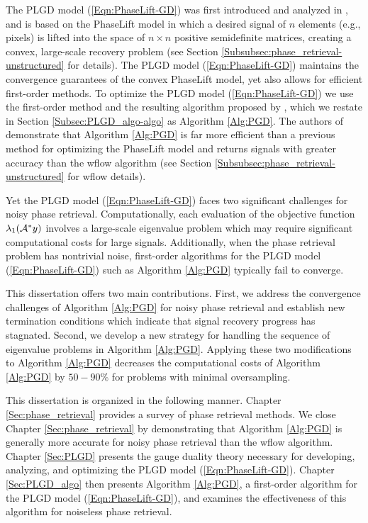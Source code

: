 The PLGD model (\ref{Eqn:PhaseLift-GD}) was first introduced and analyzed in \cite{DBLP:journals/siamsc/FriedlanderM16}, and is based on the PhaseLift model \cite{DBLP:journals/siamis/CandesESV13} in which a desired signal of $n$ elements (e.g., pixels) is lifted into the space of $n \times n$ positive semidefinite matrices, creating a convex, large-scale recovery problem (see Section \ref{Subsubsec:phase_retrieval-unstructured} for details).  
The PLGD model (\ref{Eqn:PhaseLift-GD}) maintains the convergence guarantees of the convex PhaseLift model, yet also allows for efficient first-order methods.
To optimize the PLGD model (\ref{Eqn:PhaseLift-GD}) we use the first-order method and the resulting algorithm proposed by \cite{DBLP:journals/siamsc/FriedlanderM16}, which we restate in Section \ref{Subsec:PLGD_algo-algo} as Algorithm \ref{Alg:PGD}.
The authors of \cite{DBLP:journals/siamsc/FriedlanderM16} demonstrate that Algorithm \ref{Alg:PGD} is far more efficient than a previous method for optimizing the PhaseLift model and returns signals with greater accuracy than the wflow algorithm \cite{DBLP:journals/tit/CandesLS15} (see Section \ref{Subsubsec:phase_retrieval-unstructured} for wflow details).  


Yet the PLGD model (\ref{Eqn:PhaseLift-GD}) faces two significant challenges for noisy phase retrieval.  
Computationally, each evaluation of the objective function $\lambda_1({\mathcal A}^*y)$ involves a large-scale eigenvalue problem which may require significant computational costs for large signals.  
Additionally, when the phase retrieval problem has nontrivial noise, first-order algorithms for the PLGD model (\ref{Eqn:PhaseLift-GD}) such as Algorithm \ref{Alg:PGD} typically fail to converge.



This dissertation offers two main contributions.  
First, we address the convergence challenges of Algorithm \ref{Alg:PGD} for noisy phase retrieval and establish new termination conditions which indicate that signal recovery progress has stagnated.  
Second, we develop a new strategy for handling the sequence of eigenvalue problems in Algorithm \ref{Alg:PGD}.
Applying these two modifications to Algorithm \ref{Alg:PGD} decreases the computational costs of Algorithm \ref{Alg:PGD} by $50-90\%$ for problems with minimal oversampling.


This dissertation is organized in the following manner.  
Chapter \ref{Sec:phase_retrieval} provides a survey of phase retrieval methods.  
We close Chapter \ref{Sec:phase_retrieval} by demonstrating that Algorithm \ref{Alg:PGD} is generally more accurate for noisy phase retrieval than the wflow algorithm.
Chapter \ref{Sec:PLGD} presents the gauge duality theory necessary for developing, analyzing, and optimizing the PLGD model (\ref{Eqn:PhaseLift-GD}).
Chapter \ref{Sec:PLGD_algo} then presents Algorithm \ref{Alg:PGD}, a first-order algorithm for the PLGD model (\ref{Eqn:PhaseLift-GD}), and examines the effectiveness of this algorithm for noiseless phase retrieval.

